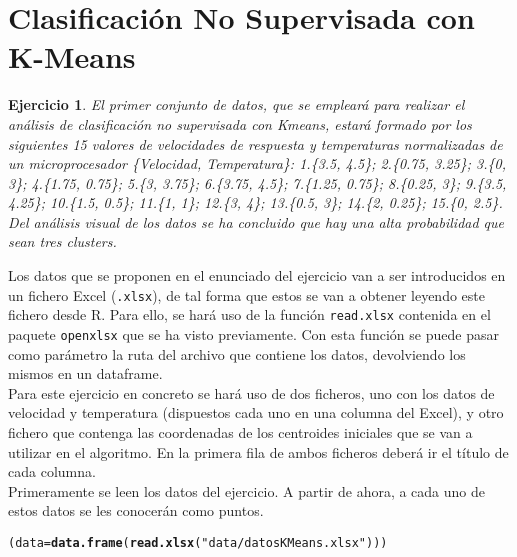 \documentclass[12pt]{report}\usepackage[]{graphicx}\usepackage[dvipsnames]{xcolor}
\makeatletter
\newcommand{\hlstr}[1]{\textcolor[rgb]{0.192,0.494,0.8}{#1}}%
\newcommand{\hlstd}[1]{\textcolor[rgb]{0.345,0.345,0.345}{#1}}%
\newcommand{\hlkwb}[1]{\textcolor[rgb]{0.69,0.353,0.396}{#1}}%
\newcommand{\hlkwd}[1]{\textcolor[rgb]{0.737,0.353,0.396}{\textbf{#1}}}%
\newenvironment{kframe}{%
 \def\at@end@of@kframe{}%
 \ifinner\ifhmode%
  \def\at@end@of@kframe{\end{minipage}}%
  \begin{minipage}{\columnwidth}%
 \fi\fi%
 \def\FrameCommand##1{\hskip\@totalleftmargin \hskip-\fboxsep
 \colorbox{shadecolor}{##1}\hskip-\fboxsep
     \hskip-\linewidth \hskip-\@totalleftmargin \hskip\columnwidth}%
 \MakeFramed {\advance\hsize-\width
   \@totalleftmargin\z@ \linewidth\hsize
   \@setminipage}}%
 {\par\unskip\endMakeFramed%
 \at@end@of@kframe}
\newenvironment{knitrout}{}{} %
\newtheorem{exercise}{Ejercicio}[section]
\makeatother
\begin{document}
	 \section{Clasificación No Supervisada con K-Means}
	 
	 \begin{exercise}
	 	El primer conjunto de datos, que se empleará para realizar el análisis de clasificación no supervisada con Kmeans, estará formado por los siguientes 15 valores de velocidades de respuesta y temperaturas normalizadas de un microprocesador \{Velocidad, Temperatura\}: 1.\{3.5, 4.5\}; 2.\{0.75, 3.25\}; 3.\{0, 3\}; 4.\{1.75, 0.75\}; 5.\{3, 3.75\}; 6.\{3.75, 4.5\}; 7.\{1.25, 0.75\}; 8.\{0.25, 3\}; 9.\{3.5, 4.25\}; 10.\{1.5, 0.5\}; 11.\{1, 1\}; 12.\{3, 4\}; 13.\{0.5, 3\}; 14.\{2, 0.25\}; 15.\{0, 2.5\}. Del análisis visual de los datos se ha concluido que hay una alta probabilidad que sean tres clusters.
	 \end{exercise}
	 
	 Los datos que se proponen en el enunciado del ejercicio van a ser introducidos en un fichero Excel (\texttt{.xlsx}), de tal forma que estos se van a obtener leyendo este fichero desde R. Para ello, se hará uso de la función \texttt{read.xlsx} contenida en el paquete \texttt{openxlsx} que se ha visto previamente. Con esta función se puede pasar como parámetro la ruta del archivo que contiene los datos, devolviendo los mismos en un dataframe.\\
	 
		 Para este ejercicio en concreto se hará uso de dos ficheros, uno con los datos de velocidad y temperatura (dispuestos cada uno en una columna del Excel), y otro fichero que contenga las coordenadas de los centroides iniciales que se van a utilizar en el algoritmo. En la primera fila de ambos ficheros deberá ir el título de cada columna. \\
	 
	 Primeramente se leen los datos del ejercicio. A partir de ahora, a cada uno de estos datos se les conocerán como puntos.
	 
\begin{knitrout}
\color{fgcolor}\begin{kframe}
\begin{alltt}
\hlstd{(data} \hlkwb{=} \hlkwd{data.frame}\hlstd{(}\hlkwd{read.xlsx}\hlstd{(}\hlstr{"data/datosKMeans.xlsx"}\hlstd{)))}
\end{alltt}


{\ttfamily\noindent\bfseries{}}\end{kframe}
\end{knitrout}
	 
\end{document}
